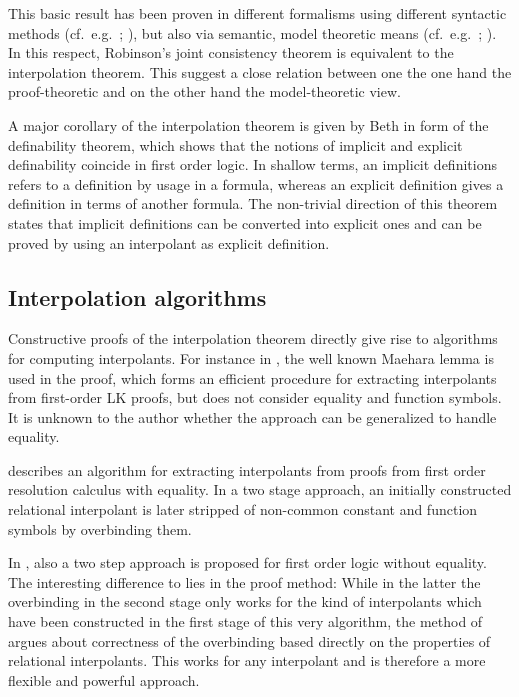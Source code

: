 \documentclass[,%
			paper=a4,%
			DIV11,
			liststotoc,
			bibtotoc,
			draft=false,%
			numbers=noendperiod
			]{scrartcl}
\theoremstyle{definition}
\begin{document}
This basic result has been proven in different formalisms using different syntactic methods (cf.~e.g.~\cite{craig57linear}; \cite{takeuti1987proof}), but also via semantic, model theoretic means (cf.~e.g.~\cite[section 5.2]{shoenfield1967mathematical}; \cite[theorem~2.2.20]{chang1990model}).
In this respect, Robinson's joint consistency theorem is equivalent to the interpolation theorem.
%
%
This suggest a close relation between one the one hand the proof-theoretic and on the other hand the model-theoretic view.

A major corollary of the interpolation theorem is given by Beth in form of the definability theorem, which shows that the notions of implicit and explicit definability coincide in first order logic.
In shallow terms, an implicit definitions refers to a definition by usage in a formula, whereas an explicit definition gives a definition in terms of another formula.
The non-trivial direction of this theorem states that implicit definitions can be converted into explicit ones and can be proved by using an interpolant as explicit definition.


\subsection{Interpolation algorithms}
\label{algos}

Constructive proofs of the interpolation theorem directly give rise to algorithms for computing interpolants.
For instance in \cite[theorem 6.6]{takeuti1987proof}, the well known Maehara lemma is used in the proof, which forms an efficient procedure for extracting interpolants from first-order LK proofs, but does not consider equality and function symbols.
It is unknown to the author whether the approach can be generalized to handle equality.

\cite{Huang95} describes an algorithm for extracting interpolants from proofs from first order resolution calculus with equality.
In a two stage approach, an initially constructed relational interpolant is later stripped of non-common constant and function symbols by overbinding them.

In \cite{baaz2011methods}, also a two step approach is proposed for first order logic without equality.
The interesting difference to \cite{Huang95} lies in the proof method:
While in the latter the overbinding in the second stage only works for the kind of interpolants which have been constructed in the first stage of this very algorithm, the method of \cite{baaz2011methods} argues about correctness of the overbinding based directly on the properties of relational interpolants.
This works for any interpolant and is therefore a more flexible and powerful approach.
\end{document}
